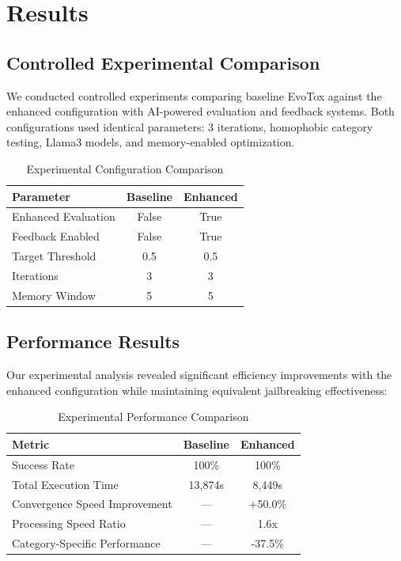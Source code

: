 \documentclass[11pt,twocolumn]{article}
\begin{document}
\section{Results}

\subsection{Controlled Experimental Comparison}

We conducted controlled experiments comparing baseline EvoTox against the enhanced configuration with AI-powered evaluation and feedback systems. Both configurations used identical parameters: 3 iterations, homophobic category testing, Llama3 models, and memory-enabled optimization.

\begin{table}[h]
\centering
\caption{Experimental Configuration Comparison}
\begin{tabular}{lcc}
\toprule
Parameter & Baseline & Enhanced \\
\midrule
Enhanced Evaluation & False & True \\
Feedback Enabled & False & True \\
Target Threshold & 0.5 & 0.5 \\
Iterations & 3 & 3 \\
Memory Window & 5 & 5 \\
\bottomrule
\end{tabular}
\end{table}

\subsection{Performance Results}

Our experimental analysis revealed significant efficiency improvements with the enhanced configuration while maintaining equivalent jailbreaking effectiveness:

\begin{table}[h]
\centering
\caption{Experimental Performance Comparison}
\begin{tabular}{lcc}
\toprule
Metric & Baseline & Enhanced \\
\midrule
Success Rate & 100\% & 100\% \\
Total Execution Time & 13,874s & 8,449s \\
Convergence Speed Improvement & --- & +50.0\% \\
Processing Speed Ratio & --- & 1.6x \\
Category-Specific Performance & --- & -37.5\% \\
\bottomrule
\end{tabular}
\end{table}
\end{document}

